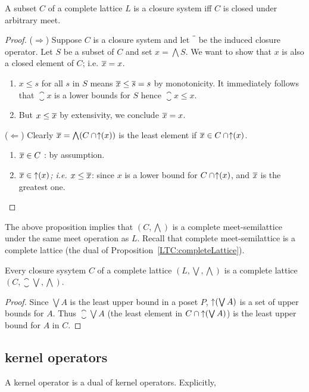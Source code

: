 %
\begin{proposition}
A subset $C$ of a complete lattice $L$ is a closure system 
iff $C$ is closed under arbitrary meet.
\end{proposition}

\begin{proof}
($\Rightarrow$) 
Suppose $C$ is a closure system and let $\closureOP$ be the induced closure operator. 
Let $S$ be a subset of $C$ and set $x = \bigwedge S$. 
We want to show that $x$ is also a closed element of $C$; i.e. $\overline{x} = x$. 
\begin{enumerate}
\item
$x \leq s$ for all $s$ in $S$ means $\overline{x} \leq \overline{s} = s$ by monotonicity.
It immediately follows that $\closure{x}$ is a lower bounds for $S$ hence $\closure{x} \leq x$. 
\item 
But $x \leq \overline{x}$ by extensivity, we conclude $\overline{x} = x$.
\end{enumerate}
($\Leftarrow$)
Clearly $\overline{x} = \bigwedge (C\cap\!\mathop{\uparrow}(x)) $ 
 is the least element if $\overline{x} \in C\cap\!\mathop{\uparrow}(x)$.
\begin{enumerate}
\item
{\em $\overline{x} \in C$} : by assumption. 
\item 
{\em $\overline{x} \in \mathop{\uparrow}(x)$; i.e. $x \leq \overline{x}$}: 
 since $x$ is a lower bound for $C\cap\!\mathop{\uparrow}(x)$, and $\overline{x}$ is the greatest one. 
\end{enumerate}
\end{proof}
%
%
The above proposition implies that $(C,\bigwedge)$ is a complete meet-semilattice 
under the same meet operation as $L$. 
Recall that complete meet-semilattice is a complete lattice (the dual of Proposition~\ref{LTC:completeLattice}).

\begin{theorem}
Every closure sysytem $C$ of a complete lattice $(L,\bigvee,\bigwedge)$
is a complete lattice $(C,\closure{\bigvee},\bigwedge)$. 
\end{theorem}
\begin{proof}
Since $\bigvee A$ is the least upper bound in a poset $P$, 
$\mathop{\uparrow}(\bigvee A)$ is a set of upper bounds for $A$. 
Thus $\closure{\bigvee A}$
(the least element in $C \cap \mathop{\uparrow}(\bigvee A)$)
is the least upper bound for $A$
in $C$.
\end{proof}


\subsection{kernel operators}
A kernel operator is a dual of kernel operators. Explicitly, 

